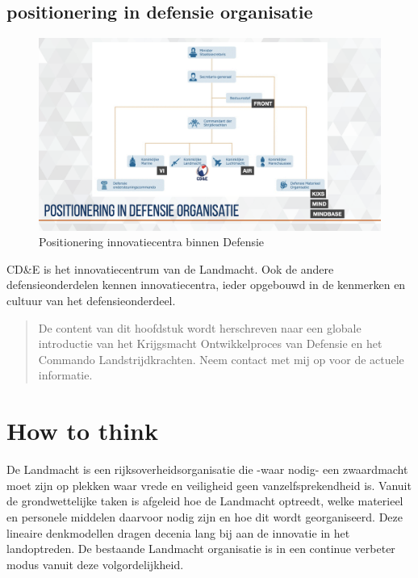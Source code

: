 \documentclass[
]{book}
\begin{document}
\hypertarget{positionering-in-defensie-organisatie}{%
\section{positionering in defensie organisatie}\label{positionering-in-defensie-organisatie}}

\begin{figure}

{\centering \includegraphics[width=0.7\linewidth]{data/keynote-slides/20200430-CDE-Designprocess/20200430-CDE-Designprocess.009-1} 

}

\caption{Positionering innovatiecentra binnen Defensie }\label{fig:unnamed-chunk-6}
\end{figure}

CD\&E is het innovatiecentrum van de Landmacht. Ook de andere defensieonderdelen kennen innovatiecentra, ieder opgebouwd in de kenmerken en cultuur van het defensieonderdeel.

\begin{quote}
De content van dit hoofdstuk wordt herschreven naar een globale introductie van het Krijgsmacht Ontwikkelproces van Defensie en het Commando Landstrijdkrachten. Neem contact met mij op voor de actuele informatie.
\end{quote}

\hypertarget{how-to-think}{%
\chapter{How to think}\label{how-to-think}}

De Landmacht is een rijksoverheidsorganisatie die -waar nodig- een zwaardmacht moet zijn op plekken waar vrede en veiligheid geen vanzelfsprekendheid is. Vanuit de grondwettelijke taken is afgeleid hoe de Landmacht optreedt, welke materieel en personele middelen daarvoor nodig zijn en hoe dit wordt georganiseerd. Deze lineaire denkmodellen dragen decenia lang bij aan de innovatie in het landoptreden. De bestaande Landmacht organisatie is in een continue verbeter modus vanuit deze volgordelijkheid.
\end{document}
